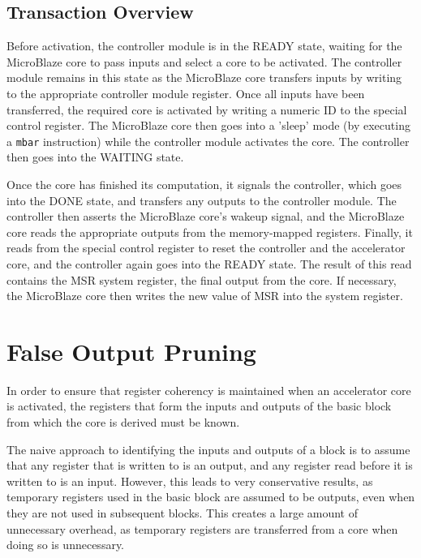 \documentclass{UoYCSproject}
\begin{document}
\subsection{Transaction Overview}

Before activation, the controller module is in the READY state, waiting for the MicroBlaze core to pass inputs and select
a core to be activated. The controller module remains in this state as the MicroBlaze core transfers inputs by writing to
the appropriate controller module register. Once all inputs have been transferred, the required core is activated by writing
a numeric ID to the special control register. The MicroBlaze core then goes into a 'sleep' mode (by executing a \texttt{mbar}
instruction) while the controller module activates the core. The controller then goes into the WAITING state.

Once the core has finished its computation, it signals the controller, which goes into the DONE state, and transfers any outputs
to the controller module. The controller then asserts the MicroBlaze core's wakeup signal, and the MicroBlaze core reads
the appropriate outputs from the memory-mapped registers. Finally, it reads from the special control register to reset the
controller and the accelerator core, and the controller again goes into the READY state. The result of this read contains
the MSR system register, the final output from the core. If necessary, the MicroBlaze core then writes the new value of MSR into
the system register.

\section{False Output Pruning}

In order to ensure that register coherency is maintained when an accelerator core is activated,
the registers that form the inputs and outputs of the basic block from which the core is derived must
be known.

The naive approach to identifying the inputs and outputs of a block is to assume that
any register that is written to is an output, and any register read before it is written to is an input.
However, this leads to very conservative results, as temporary registers used in the basic block
are assumed to be outputs, even when they are not used in subsequent blocks.
This creates a large amount of unnecessary overhead, as temporary registers are transferred from a core
when doing so is unnecessary.
\end{document}
